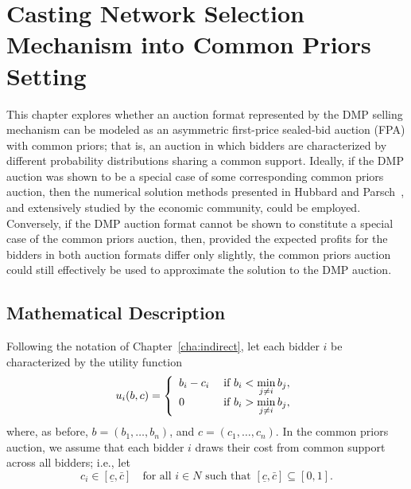 \chapter{Casting Network Selection Mechanism into Common Priors Setting}
\label{cha:approximation}

\minitoc
\vspace{10mm}

This chapter explores whether an auction format represented by the DMP selling mechanism can be modeled as an asymmetric first-price sealed-bid auction (FPA) with common priors; that is, an auction in which bidders are characterized by different probability distributions sharing a common support. Ideally, if the DMP auction was shown to be a special case of some corresponding common priors auction, then the numerical solution methods presented in Hubbard and Parsch~\cite{HubbardPaarsch2011}, and extensively studied by the economic community, could be employed. Conversely, if the DMP auction format cannot be shown to constitute a special case of the common priors auction, then, provided the expected profits for the bidders in both auction formats differ only slightly, the common priors auction could still effectively be used to approximate the solution to the DMP auction.

\section{Mathematical Description} %
\label{sec:mathematical_description_approximation}

Following the notation of Chapter~\ref{cha:indirect}, let each bidder $i$ be characterized by the utility function
\begin{equation*}
    u_i(b,c) = \left\{
  \begin{array}{l l}
    b_i-c_i & \;\text{if } b_i < \displaystyle\min_{j\neq i}b_j,\\
    0 & \;\text{if } b_i > \displaystyle\min_{j\neq i}b_j,
  \end{array}\right.
\end{equation*}
where, as before, $b = (b_1,\ldots,b_n)$, and $c = (c_1,\ldots,c_n)$. In the common priors auction, we assume that each bidder $i$ draws their cost from common support across all bidders; i.e., let
\begin{equation*}
  c_i\in [\underline{c}, \bar{c}] \quad\text{for all } i\in N \text{ such that } [\underline{c}, \bar{c}]\subseteq [0, 1].
\end{equation*}

